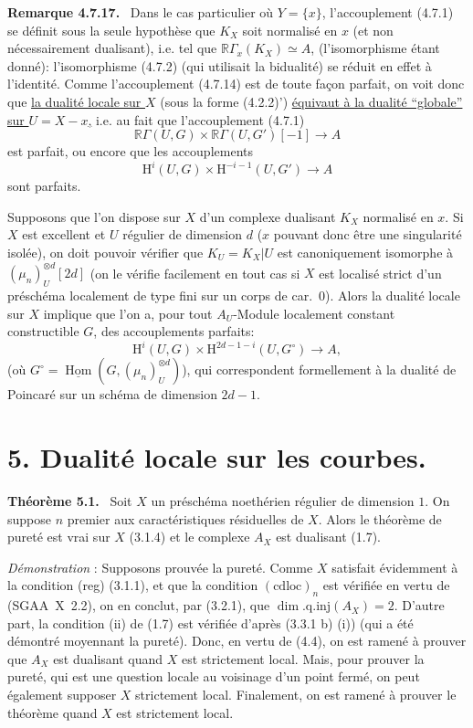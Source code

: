 \documentclass[11pt]{article}
\newenvironment{statement}[1]{\par\medskip\noindent\textbf{#1.}\ }{\par\medskip}
\renewcommand{\H}{\mathrm{H}}
\DeclareMathOperator{\Hom}{Hom}
\newcommand{\R}{\mathbb{R}}\newcommand{\RHomCore}{\mathbb{R}\mathrm{Hom}}
\providecommand{\uHom}{\underline{\Hom}}
\providecommand{\Hom}{\operatorname{Hom}}
\providecommand{\R}{\mathrm R}
\providecommand{\Hom}{\operatorname{Hom}}
\begin{document}
\begin{statement}{Remarque 4.7.17}
Dans le cas particulier où $Y=\{x\}$, l'accouplement (4.7.1) se définit sous la seule hypothèse que $K_X$ soit normalisé en $x$ (et non nécessairement dualisant), i.e. tel que $\R\Gamma_x(K_X)\simeq A$, (l'isomorphisme étant donné): l'isomorphisme (4.7.2) (qui utilisait la bidualité) se réduit en effet à l'identité. Comme l'accouplement (4.7.14) est de toute façon parfait, on voit donc que \underline{la dualité locale sur $X$} (sous la forme (4.2.2)') \underline{équivaut à la dualité ``globale'' sur $U=X-x$,} i.e. au fait que l'accouplement (4.7.1)
\[
\R\Gamma(U,G)\times\R\Gamma(U,G')[-1]\longrightarrow A
\]
est parfait, ou encore que les accouplements
\[
\H^i(U,G)\times\H^{-i-1}(U,G')\longrightarrow A
\]
sont parfaits.

Supposons que l'on dispose sur $X$ d'un complexe dualisant $K_X$ normalisé en $x$. Si $X$ est excellent et $U$ régulier de dimension $d$ ($x$ pouvant donc être une singularité isolée), on doit pouvoir vérifier que $K_U=K_X|U$ est canoniquement isomorphe à $(\mu_n)_U^{\otimes d}[2d]$ (on le vérifie facilement en tout cas si $X$ est localisé strict d'un préschéma localement de type fini sur un corps de car.~0). Alors la dualité locale sur $X$ implique que l'on a, pour tout $A_U$-Module localement constant constructible $G$, des accouplements parfaits:
\[
\H^i(U,G)\times\H^{2d-1-i}(U,G^\circ)\longrightarrow A,
\]
(où $G^\circ=\uHom(G,(\mu_n)_U^{\otimes d})$), qui correspondent formellement à la dualité de Poincaré sur un schéma de dimension $2d-1$.
\end{statement}

\section*{5. Dualité locale sur les courbes.}

\begin{statement}{Théorème 5.1}
Soit $X$ un préschéma noethérien régulier de dimension $1$. On suppose $n$ premier aux caractéristiques résiduelles de $X$. Alors le théorème de pureté est vrai sur $X$ (3.1.4) et le complexe $A_X$ est dualisant (1.7).
\end{statement}

\emph{Démonstration} : Supposons prouvée la pureté. Comme $X$ satisfait évidemment à la condition (reg) (3.1.1), et que la condition $(\mathrm{cdloc})_n$ est vérifiée en vertu de (SGAA~X~2.2), on en conclut, par (3.2.1), que $\dim.\mathrm{q.inj}(A_X)=2$. D'autre part, la condition (ii) de (1.7) est vérifiée d'après (3.3.1 b) (i)) (qui a été démontré moyennant la pureté). Donc, en vertu de (4.4), on est ramené à prouver que $A_X$ est dualisant quand $X$ est strictement local. Mais, pour prouver la pureté, qui est une question locale au voisinage d'un point fermé, on peut également supposer $X$ strictement local. Finalement, on est ramené à prouver le théorème quand $X$ est strictement local.
\end{document}
